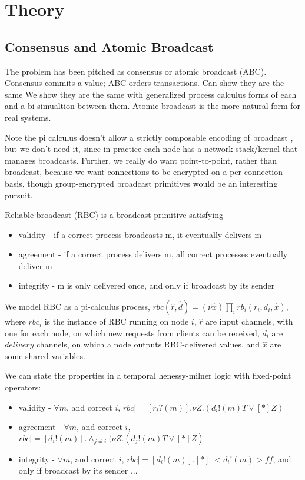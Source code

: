 \chapter{Theory}

\section{Consensus and Atomic Broadcast}
The problem has been pitched as consensus or atomic broadcast (ABC).
Consensus commits a value; ABC orders transactions.
Can show they are the same \cite{chandra1996unreliable}
We show they are the same with generalized process calculus forms of each and a bi-simualtion between them.
Atomic broadcast is the more natural form for real systems.

Note the pi calculus doesn't allow a strictly composable encoding of broadcast \cite{ene1999expressiveness},
but we don't need it, since in practice each node has a network stack/kernel that manages broadcasts.
Further, we really do want point-to-point, rather than broadcast,
because we want connections to be encrypted on a per-connection basis,
though group-encrypted broadcast primitives would be an interesting pursuit.

Reliable broadcast (RBC) is a broadcast primitive satisfying

\begin{itemize}
\item validity - if a correct process broadcasts m, it eventually delivers m
\item agreement - if a correct process delivers m, all correct processes eventually deliver m
\item integrity - m is only delivered once, and only if broadcast by its sender
\end{itemize}

We model RBC as a pi-calculus process, 
$rbc(\hat{r}, \hat{d}) = (\nu \hat{x}) \prod_i rb_i(r_i, d_i, \hat{x})$,
where $rbc_i$ is the instance of RBC running on node $i$, 
$\hat{r}$ are input channels, with one for each node, 
on which new requests from clients can be received, 
$d_i$ are $delivery$ channels, on which a node outputs RBC-delivered values,
and $\hat{x}$ are some shared variables.

We can state the properties in a temporal henessy-milner logic with fixed-point operators:
\begin{itemize}
\item validity - $ \forall m$, and correct $i$, $rbc |= [ r_i?(m) ] . \nu Z . ( d_i!(m)T \vee [*]Z) $
\item agreement - $ \forall m$, and correct $i$, $rbc |= [ d_i!(m) ] . \wedge_{j \neq i} ( \nu Z . (d_j!(m)T \vee [*]Z) $
\item integrity - $ \forall m$, and correct $i$, $rbc |= [ d_i!(m) ] . [ * ] . < d_i!(m) > ff $, and only if broadcast by its sender ...
\end{itemize}

